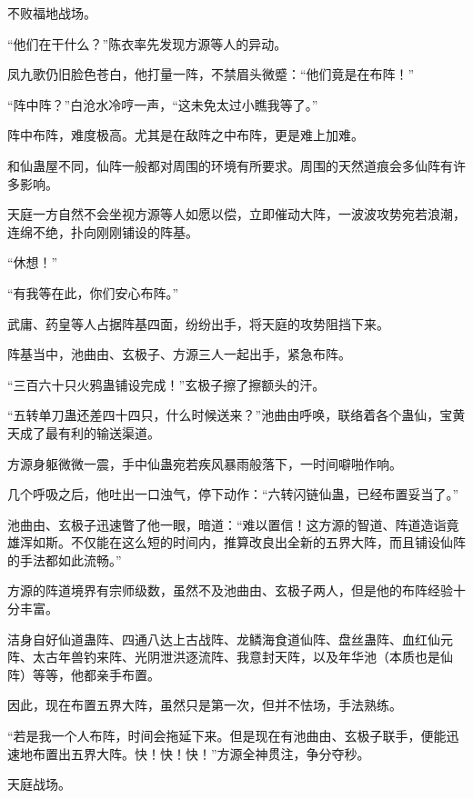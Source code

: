 
\begin{this_body}



不败福地战场。

“他们在干什么？”陈衣率先发现方源等人的异动。

凤九歌仍旧脸色苍白，他打量一阵，不禁眉头微蹙：“他们竟是在布阵！”

“阵中阵？”白沧水冷哼一声，“这未免太过小瞧我等了。”

阵中布阵，难度极高。尤其是在敌阵之中布阵，更是难上加难。

和仙蛊屋不同，仙阵一般都对周围的环境有所要求。周围的天然道痕会多仙阵有许多影响。

天庭一方自然不会坐视方源等人如愿以偿，立即催动大阵，一波波攻势宛若浪潮，连绵不绝，扑向刚刚铺设的阵基。

“休想！”

“有我等在此，你们安心布阵。”

武庸、药皇等人占据阵基四面，纷纷出手，将天庭的攻势阻挡下来。

阵基当中，池曲由、玄极子、方源三人一起出手，紧急布阵。

“三百六十只火鸦蛊铺设完成！”玄极子擦了擦额头的汗。

“五转单刀蛊还差四十四只，什么时候送来？”池曲由呼唤，联络着各个蛊仙，宝黄天成了最有利的输送渠道。

方源身躯微微一震，手中仙蛊宛若疾风暴雨般落下，一时间噼啪作响。

几个呼吸之后，他吐出一口浊气，停下动作：“六转闪链仙蛊，已经布置妥当了。”

池曲由、玄极子迅速瞥了他一眼，暗道：“难以置信！这方源的智道、阵道造诣竟雄浑如斯。不仅能在这么短的时间内，推算改良出全新的五界大阵，而且铺设仙阵的手法都如此流畅。”

方源的阵道境界有宗师级数，虽然不及池曲由、玄极子两人，但是他的布阵经验十分丰富。

洁身自好仙道蛊阵、四通八达上古战阵、龙鳞海食道仙阵、盘丝蛊阵、血红仙元阵、太古年兽钓来阵、光阴泄洪逐流阵、我意封天阵，以及年华池（本质也是仙阵）等等，他都亲手布置。

因此，现在布置五界大阵，虽然只是第一次，但并不怯场，手法熟练。

“若是我一个人布阵，时间会拖延下来。但是现在有池曲由、玄极子联手，便能迅速地布置出五界大阵。快！快！快！”方源全神贯注，争分夺秒。

天庭战场。


\end{this_body}
